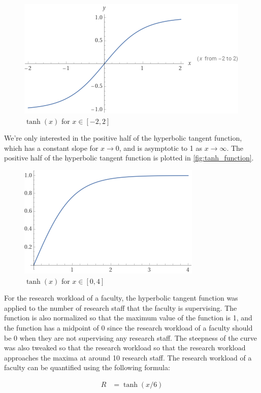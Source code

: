 \begin{figure}[htpb]
  \centering
  \includegraphics[width=0.5\linewidth]{images/tanh_fullplot.png}
  \caption{\(\tanh(x)\) for \(x \in [-2, 2]\)}
  \label{fig:tanh_full_function}
\end{figure}

We're only interested in the positive half of the hyperbolic tangent function, which has a constant slope for $x \to 0$, and is asymptotic to 1 as $x \to \infty$. The positive half of the hyperbolic tangent function is plotted in \autoref{fig:tanh_function}.

\begin{figure}[htpb]
  \centering
  \includegraphics[width=0.5\linewidth]{images/tanh_plot.png}
  \caption{\(\tanh(x)\) for \(x \in [0, 4]\)}
  \label{fig:tanh_function}
\end{figure}

For the research workload of a faculty, the hyperbolic tangent function was applied to the number of research staff that the faculty is supervising. The function is also normalized so that the maximum value of the function is 1, and the function has a midpoint of 0 since the research workload of a faculty should be 0 when they are not supervising any research staff. The steepness of the curve was also tweaked so that the research workload so that the research workload approaches the maxima at around 10 research staff. The research workload of a faculty can be quantified using the following formula:

\begin{equation}
  \begin{aligned}
    R & = \tanh(x/6)
  \end{aligned}
\end{equation}

